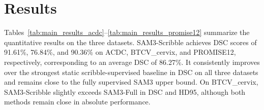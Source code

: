 \documentclass[preprint,12pt]{elsarticle}
\begin{document}
\section{Results}
\label{sec:results}

Tables~\ref{tab:main_results_acdc}--\ref{tab:main_results_promise12} summarize the quantitative results on the three datasets. SAM3-Scribble achieves DSC scores of 91.61\%, 76.84\%, and 90.36\% on ACDC, BTCV\_cervix, and PROMISE12, respectively, corresponding to an average DSC of 86.27\%. It consistently improves over the strongest static scribble-supervised baseline in DSC on all three datasets and remains close to the fully supervised SAM3 upper bound. On BTCV\_cervix, SAM3-Scribble slightly exceeds SAM3-Full in DSC and HD95, although both methods remain close in absolute performance.

\end{document}
